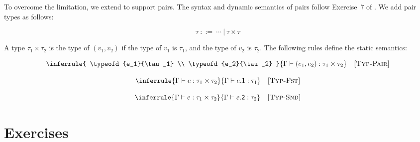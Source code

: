 To overcome the limitation, we extend \lang to support pairs.
The syntax and dynamic semantics of pairs follow
Exercise~7 of .
We add pair types as follows:

\[ \tau \ ::= \ \cdots\ | \ \tau\times\tau \]

A type $\tau_1\times\tau_2$ is the type of $(v_1,v_2)$ if the type of $v_1$ is
$\tau_1$, and the type of $v_2$ is $\tau_2$.
The following rules define the static semantics:


\vspace{-1em}

\[
  \inferrule
  { \typeofd{e_1}{\tau_1} \\
    \typeofd{e_2}{\tau_2} }
  { \typeofd{(e_1,e_2)}{\tau_1\times\tau_2} }
  \quad\textsc{[Typ-Pair]}
\]


\vspace{-1em}

\[
  \inferrule
  { \typeofd{e}{\tau_1\times\tau_2} }
  { \typeofd{e\textsf{.1}}{\tau_1} }
  \quad\textsc{[Typ-Fst]}
\]


\vspace{-1em}

\[
  \inferrule
  { \typeofd{e}{\tau_1\times\tau_2} }
  { \typeofd{e\textsf{.2}}{\tau_2} }
  \quad\textsc{[Typ-Snd]}
\]

\section{Exercises}

